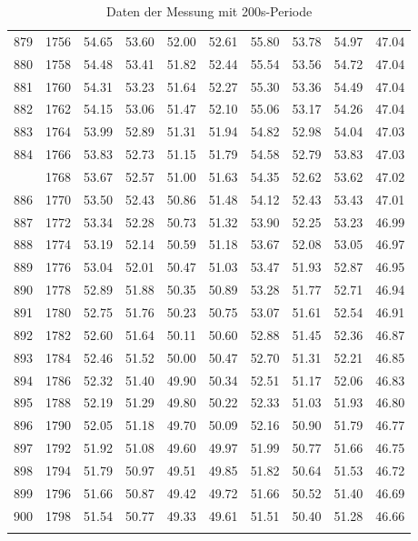 \begin{longtable}{rrllllllll}
		879 & 1756 & 54.65 & 53.60 & 52.00 & 52.61 & 55.80 & 53.78 & 54.97 & 47.04 \\ 
		880 & 1758 & 54.48 & 53.41 & 51.82 & 52.44 & 55.54 & 53.56 & 54.72 & 47.04 \\ 
		881 & 1760 & 54.31 & 53.23 & 51.64 & 52.27 & 55.30 & 53.36 & 54.49 & 47.04 \\ 
		882 & 1762 & 54.15 & 53.06 & 51.47 & 52.10 & 55.06 & 53.17 & 54.26 & 47.04 \\ 
		883 & 1764 & 53.99 & 52.89 & 51.31 & 51.94 & 54.82 & 52.98 & 54.04 & 47.03 \\ 
		884 & 1766 & 53.83 & 52.73 & 51.15 & 51.79 & 54.58 & 52.79 & 53.83 & 47.03 \\ 
		\pagebreak
		885 & 1768 & 53.67 & 52.57 & 51.00 & 51.63 & 54.35 & 52.62 & 53.62 & 47.02 \\ 
		886 & 1770 & 53.50 & 52.43 & 50.86 & 51.48 & 54.12 & 52.43 & 53.43 & 47.01 \\ 
		887 & 1772 & 53.34 & 52.28 & 50.73 & 51.32 & 53.90 & 52.25 & 53.23 & 46.99 \\ 
		888 & 1774 & 53.19 & 52.14 & 50.59 & 51.18 & 53.67 & 52.08 & 53.05 & 46.97 \\ 
		889 & 1776 & 53.04 & 52.01 & 50.47 & 51.03 & 53.47 & 51.93 & 52.87 & 46.95 \\ 
		890 & 1778 & 52.89 & 51.88 & 50.35 & 50.89 & 53.28 & 51.77 & 52.71 & 46.94 \\ 
		891 & 1780 & 52.75 & 51.76 & 50.23 & 50.75 & 53.07 & 51.61 & 52.54 & 46.91 \\ 
		892 & 1782 & 52.60 & 51.64 & 50.11 & 50.60 & 52.88 & 51.45 & 52.36 & 46.87 \\ 
		893 & 1784 & 52.46 & 51.52 & 50.00 & 50.47 & 52.70 & 51.31 & 52.21 & 46.85 \\ 
		894 & 1786 & 52.32 & 51.40 & 49.90 & 50.34 & 52.51 & 51.17 & 52.06 & 46.83 \\ 
		895 & 1788 & 52.19 & 51.29 & 49.80 & 50.22 & 52.33 & 51.03 & 51.93 & 46.80 \\ 
		896 & 1790 & 52.05 & 51.18 & 49.70 & 50.09 & 52.16 & 50.90 & 51.79 & 46.77 \\ 
		897 & 1792 & 51.92 & 51.08 & 49.60 & 49.97 & 51.99 & 50.77 & 51.66 & 46.75 \\ 
		898 & 1794 & 51.79 & 50.97 & 49.51 & 49.85 & 51.82 & 50.64 & 51.53 & 46.72 \\ 
		899 & 1796 & 51.66 & 50.87 & 49.42 & 49.72 & 51.66 & 50.52 & 51.40 & 46.69 \\ 
		900 & 1798 & 51.54 & 50.77 & 49.33 & 49.61 & 51.51 & 50.40 & 51.28 & 46.66 \\ 
\caption{Daten der Messung mit 200s-Periode}
\label{Messung3}
\end{longtable}
